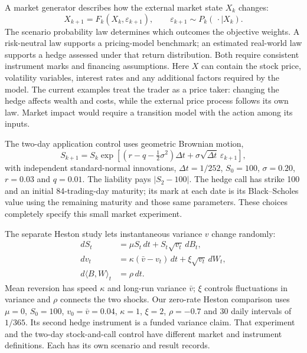 \documentclass[8pt]{strategynet-journal}
\begin{document}
\begin{SNcolumns}

A market generator describes how the external market state $X_k$ changes:
\begin{equation}
 X_{k+1}=F_k(X_k,\varepsilon_{k+1}),\qquad
 \varepsilon_{k+1}\sim P_k(\,\cdot\mid X_k).
\end{equation}
The scenario probability law determines which outcomes the objective weights.
A risk-neutral law supports a pricing-model benchmark; an estimated real-world
law supports a hedge assessed under that return distribution. Both require
consistent instrument marks and financing assumptions.
Here $X$ can contain the stock price, volatility variables, interest rates
and any additional factors required by the model. The current examples treat
the trader as a price taker: changing the hedge affects wealth and costs,
while the external price process follows its own law. Market impact would
require a transition model with the action among its inputs.

The two-day application control uses geometric Brownian motion,
\begin{equation}
 S_{k+1}=S_k\exp\!\left[(r-q-\tfrac12\sigma^2)\Delta t
                    +\sigma\sqrt{\Delta t}\,\varepsilon_{k+1}\right],
\end{equation}
with independent standard-normal innovations, $\Delta t=1/252$,
$S_0=100$, $\sigma=0.20$, $r=0.03$ and $q=0.01$.
The liability pays $|S_2-100|$. The hedge call has strike 100 and an initial
84-trading-day maturity; its mark at each date is its Black--Scholes value
using the remaining maturity and those same parameters.
These choices completely specify this small market experiment.

The separate Heston study lets instantaneous variance $v$ change randomly:
\begin{align}
 dS_t&=\mu S_t\,dt+S_t\sqrt{v_t}\,dB_t,\\
 dv_t&=\kappa(\bar v-v_t)\,dt+\xi\sqrt{v_t}\,dW_t,\\
 d\langle B,W\rangle_t&=\rho\,dt.
\end{align}
Mean reversion has speed $\kappa$ and long-run variance $\bar v$; $\xi$
controls fluctuations in variance and $\rho$ connects the two shocks.
Our zero-rate Heston comparison uses $\mu=0$, $S_0=100$,
$v_0=\bar v=0.04$, $\kappa=1$, $\xi=2$, $\rho=-0.7$ and 30 daily
intervals of $1/365$. Its second hedge instrument is a funded variance claim.
That experiment and the two-day stock-and-call control have different market
and instrument definitions. Each has its own scenario and result records.


\end{SNcolumns}
\end{document}
